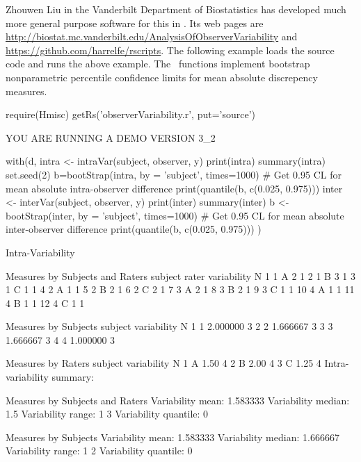 Zhouwen Liu in the Vanderbilt Department of Biostatistics has
developed much more general purpose software for this in \R.  Its web
pages are
\url{http://biostat.mc.vanderbilt.edu/AnalysisOfObserverVariability}
and \url{https://github.com/harrelfe/rscripts}.
The following example loads the source code and runs the above
example.  The \R\ functions implement bootstrap nonparametric
percentile confidence limits for mean absolute discrepency measures.
\begin{Schunk}
\begin{Sinput}
require(Hmisc)
getRs('observerVariability.r', put='source')
\end{Sinput}
\begin{Soutput}
YOU ARE RUNNING A DEMO VERSION 3_2 
\end{Soutput}
\begin{Sinput}
with(d, {
  intra <- intraVar(subject, observer, y)
  print(intra)
  summary(intra)
  set.seed(2)
  b=bootStrap(intra, by = 'subject', times=1000)
  # Get 0.95 CL for mean absolute intra-observer difference
  print(quantile(b, c(0.025, 0.975)))
  inter <- interVar(subject, observer, y)
  print(inter)
  summary(inter)
  b <- bootStrap(inter, by = 'subject', times=1000)
  # Get 0.95 CL for mean absolute inter-observer difference
  print(quantile(b, c(0.025, 0.975)))
})
\end{Sinput}
\begin{Soutput}
Intra-Variability 

Measures by Subjects and Raters
   subject rater variability N
1        1     A           2 1
2        1     B           3 1
3        1     C           1 1
4        2     A           1 1
5        2     B           2 1
6        2     C           2 1
7        3     A           2 1
8        3     B           2 1
9        3     C           1 1
10       4     A           1 1
11       4     B           1 1
12       4     C           1 1

Measures by Subjects
  subject variability N
1       1    2.000000 3
2       2    1.666667 3
3       3    1.666667 3
4       4    1.000000 3

Measures by Raters
  subject variability N
1       A        1.50 4
2       B        2.00 4
3       C        1.25 4
Intra-variability summary:

Measures by Subjects and Raters
Variability mean:  1.583333 
Variability median:  1.5 
Variability range:  1 3 
Variability quantile: 
0%:  1   25%:  1   50%:  1.5   75%:  2   100%:  3 

Measures by Subjects
Variability mean:  1.583333 
Variability median:  1.666667 
Variability range:  1 2 
Variability quantile: 
0%:  1   25%:  1.5   50%:  1.666667   75%:  1.75   100%:  2 


\end{Soutput}
\end{Schunk}

